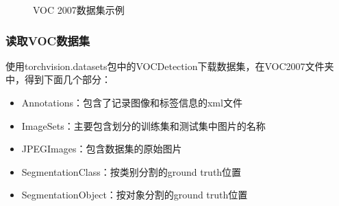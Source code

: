 \documentclass[UTF8]{ctexart}
\begin{document}
\begin{figure}[h]
{    }
    \hspace{0.5in}
    \caption{VOC 2007数据集示例}
\end{figure}

\subsubsection{读取VOC数据集}
使用torchvision.datasets包中的VOCDetection下载数据集，在VOC2007文件夹中，得到下面几个部分：
\begin{itemize}
    \item Annotations：包含了记录图像和标签信息的xml文件
    \item ImageSets：主要包含划分的训练集和测试集中图片的名称
    \item JPEGImages：包含数据集的原始图片
    \item SegmentationClass：按类别分割的ground truth位置
    \item SegmentationObject：按对象分割的ground truth位置
\end{itemize}
\end{document}
